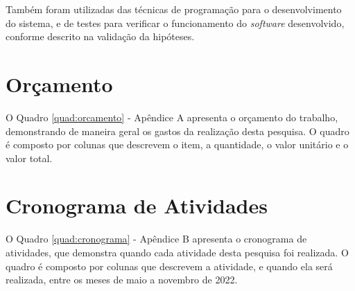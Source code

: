 Também foram utilizadas das técnicas de programação para o desenvolvimento
do sistema, e de testes para verificar o funcionamento do \emph{software}
desenvolvido, conforme descrito na validação da hipóteses.

\section{Orçamento} \label{sec:budget}

O Quadro \ref*{quad:orcamento} - Apêndice A apresenta o orçamento do trabalho,
demonstrando de maneira geral os gastos da realização desta pesquisa. O quadro
é composto por colunas que descrevem o item, a quantidade, o valor unitário e
o valor total.

\section{Cronograma de Atividades} \label{sec:schedule_activities_table}

O Quadro \ref*{quad:cronograma} - Apêndice B apresenta o cronograma de
atividades, que demonstra quando cada atividade desta pesquisa foi realizada.
O quadro é composto por colunas que descrevem a atividade, e quando ela será
realizada, entre os meses de maio a novembro de 2022.